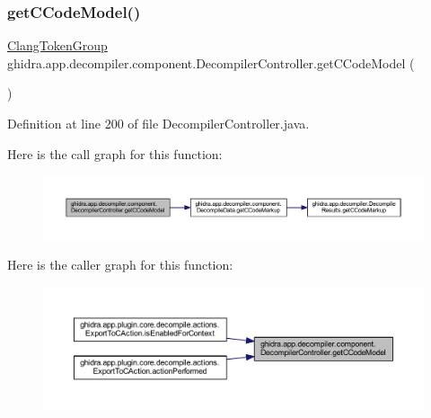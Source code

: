 \subsubsection{\texorpdfstring{getCCodeModel()}{getCCodeModel()}}
{\footnotesize\ttfamily \mbox{\hyperlink{classghidra_1_1app_1_1decompiler_1_1_clang_token_group}{Clang\+Token\+Group}} ghidra.\+app.\+decompiler.\+component.\+Decompiler\+Controller.\+get\+C\+Code\+Model (\begin{DoxyParamCaption}{ }\end{DoxyParamCaption})\hspace{0.3cm}{\ttfamily [inline]}}



Definition at line 200 of file Decompiler\+Controller.\+java.

Here is the call graph for this function\+:
\nopagebreak
\begin{figure}[H]
\begin{center}
\leavevmode
\includegraphics[width=350pt]{classghidra_1_1app_1_1decompiler_1_1component_1_1_decompiler_controller_a5030159d194659d184eaf4569726bb05_cgraph}
\end{center}
\end{figure}
Here is the caller graph for this function\+:
\nopagebreak
\begin{figure}[H]
\begin{center}
\leavevmode
\includegraphics[width=350pt]{classghidra_1_1app_1_1decompiler_1_1component_1_1_decompiler_controller_a5030159d194659d184eaf4569726bb05_icgraph}
\end{center}
\end{figure}
\mbox{\label{classghidra_1_1app_1_1decompiler_1_1component_1_1_decompiler_controller_a4ee0f6c3fe8b310fb71faefb1ee3ce99}} 
